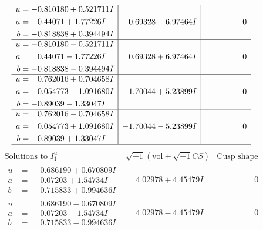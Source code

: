 \documentclass[1p]{elsarticle_modified}
\theoremstyle{definition}
\newcommand{\I}{\sqrt{-1}}
\begin{document}
$$\begin{array}{c|c|c}
\begin{aligned}
u &= -0.810180 + 0.521711 I \\
a &= \phantom{-}0.44071 + 1.77226 I \\
b &= -0.818838 + 0.394494 I\end{aligned}
 & \phantom{-}0.69328 - 6.97464 I & \phantom{-0.000000 } 0 \\ \hline\begin{aligned}
u &= -0.810180 - 0.521711 I \\
a &= \phantom{-}0.44071 - 1.77226 I \\
b &= -0.818838 - 0.394494 I\end{aligned}
 & \phantom{-}0.69328 + 6.97464 I & \phantom{-0.000000 } 0 \\ \hline\begin{aligned}
u &= \phantom{-}0.762016 + 0.704658 I \\
a &= \phantom{-}0.054773 - 1.091680 I \\
b &= -0.89039 - 1.33047 I\end{aligned}
 & -1.70044 + 5.23899 I & \phantom{-0.000000 } 0 \\ \hline\begin{aligned}
u &= \phantom{-}0.762016 - 0.704658 I \\
a &= \phantom{-}0.054773 + 1.091680 I \\
b &= -0.89039 + 1.33047 I\end{aligned}
 & -1.70044 - 5.23899 I & \phantom{-0.000000 } 0\\
 \hline 
 \end{array}$$\newpage$$\begin{array}{c|c|c}  
\text{Solutions to }I^u_{1}& \I (\text{vol} + \sqrt{-1}CS) & \text{Cusp shape}\\
 \hline 
\begin{aligned}
u &= \phantom{-}0.686190 + 0.670809 I \\
a &= \phantom{-}0.07203 + 1.54734 I \\
b &= \phantom{-}0.715833 + 0.994636 I\end{aligned}
 & \phantom{-}4.02978 + 4.45479 I & \phantom{-0.000000 } 0 \\ \hline\begin{aligned}
u &= \phantom{-}0.686190 - 0.670809 I \\
a &= \phantom{-}0.07203 - 1.54734 I \\
b &= \phantom{-}0.715833 - 0.994636 I\end{aligned}
 & \phantom{-}4.02978 - 4.45479 I & \phantom{-0.000000 } 0 \\ \hline\begin{aligned}

\end{aligned}
\end{array}$$
\end{document}
